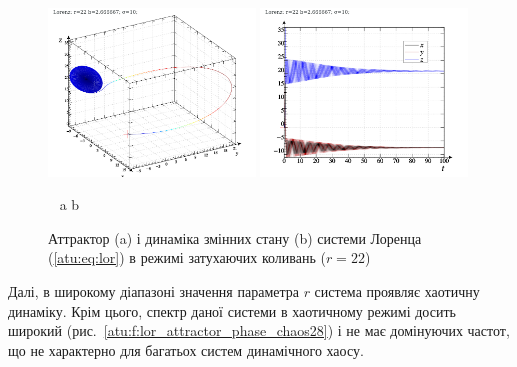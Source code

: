 \begin{figure}[ht!]
\begin{center}
  \includegraphics[width=0.49\textwidth]{p/cha/lor/lor0-p_xyz_r=022.png}
  \hfill
  \includegraphics[width=0.49\textwidth]{p/cha/lor/lor0-p_t_r=022.png}
\end{center}
  \vspace{-1.0ex}
  \begin{center}
    ~ \hfill a \hfill\hfill b \hfill ~
  \end{center}
  \vspace{-1.5ex}
  \caption{Аттрактор (a) і динаміка змінних стану (b) системи Лоренца (\ref{atu:eq:lor}) в режимі затухаючих коливань ($r = 22$)}
\label{atu:f:lor_attractor_fading}
\end{figure}

Далі, в широкому діапазоні значення параметра $r$ система проявляє хаотичну
динаміку. Крім цього, спектр даної системи в хаотичному режимі досить широкий
(рис.~\ref{atu:f:lor_attractor_phase_chaos28}) і не має домінуючих
частот, що не характерно для багатьох систем динамічного хаосу.

